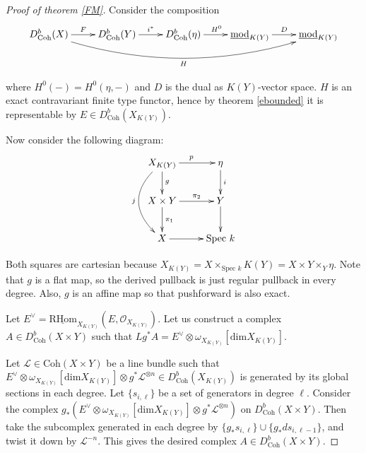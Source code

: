 \documentclass{amsart}
\begin{document}
\begin{proof}[Proof of theorem \ref{FM}]
Consider the composition
$$\xymatrix{
D^{b}_{\mathrm{Coh}}(X) \ar@/_2
pc/ [rrrr]_{H}  \ar[r]^-{F} & D^{b}_{\mathrm{Coh}}(Y) \ar[r]^-{i^{*}} & D^{b}_{\mathrm{Coh}}(\eta) \ar[r]^{H^{0}} & \underline{\mathrm{mod}}_{K(Y)} \ar[r]^{D} &\underline{\mathrm{mod}}_{K(Y)}
}$$

where $H^{0}(-)=H^{0}(\eta,-)$ and $D$ is the dual as $K(Y)$-vector space. $H$ is an exact contravariant finite type functor, hence by theorem \ref{ebounded} it is representable by $E\in D^{b}_{\text{Coh}}(X_{K(Y)})$.

Now consider the following diagram:
$$\xymatrix{
X_{K(Y)} \ar[r]^{p} \ar[d]^{g} \ar@/_2pc/[dd]_{j} &\eta \ar[d]^{i} \\
X\times Y \ar[r]^-{\pi_{2}} \ar[d]^{\pi_{1}} & Y \ar[d]\\
X\ar[r] &\text{Spec }k
}$$

Both squares are cartesian because $X_{K(Y)}=X\times_{\text{Spec }k} K(Y)=X\times Y \times_{Y}\eta$. Note that $g$ is a flat map, so the derived pullback is just regular pullback in every degree. Also, $g$ is an affine map so that pushforward is also exact. 

Let $E^{\vee}=\underline{\mathrm{RHom}}_{X_{K(Y)}}(E,{\mathcal{O}}_{X_{K(Y)}})$. Let us construct a complex $A\in D^{b}_{\mathrm{Coh}}(X\times Y)$ such that $Lg^{*}A=E^{\vee}\otimes \omega_{X_{K(Y)}}[\mbox{dim}X_{K(Y)}]$. 

Let $\mathcal{L}\in \text{Coh}(X\times Y)$ be a line bundle such that $E^{\vee}\otimes \omega_{X_{K(Y)}}[\mbox{dim}X_{K(Y)}]\otimes g^{*}\mathcal{L}^{\otimes n} \in D^{b}_{\text{Coh}}(X_{K(Y)})$ is generated by its global sections in each degree. Let $\{s_{i,\ell}\}$ be a set of generators in degree $\ell$. Consider the complex $g_{*}(E^{\vee}\otimes \omega_{X_{K(Y)}}[\mbox{dim}X_{K(Y)}]\otimes g^{*}\mathcal{L}^{\otimes n})$ on $D^{b}_{\mathrm{Coh}}(X\times Y)$. Then take the subcomplex  generated in each degree by $\{g_{*}s_{i,\ell}\} \cup \{g_{*}d s_{i,\ell-1}\} $, and twist it down by $\mathcal{L}^{-n}$. This gives the desired complex $A\in D^{b}_{\mathrm{Coh}}(X\times Y)$.


\end{proof}
\end{document}

